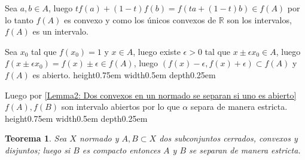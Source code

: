 \documentclass[11pt]{article}
\newcommand{\R}{{\mathbb{R}}}
\newtheorem{theorem}{Teorema}
\numberwithin{theorem}{subsection}
\newenvironment{proof}[1][Demostraci\'on]{\begin{trivlist}
		\item[\hskip \labelsep {\bfseries #1}]}{\end{trivlist}}
\newcommand{\qed}{\nobreak \ifvmode \relax \else
	\ifdim\lastskip<1.5em \hskip-\lastskip
	\hskip1.5em plus0em minus0.5em \fi \nobreak
	\vrule height0.75em width0.5em depth0.25em\fi}
\begin{document}
\begin{proof}
	\begin{proof}[Demostraci\'on del lema]
		Sea $a,b \in A$, luego $tf(a) + (1-t)f(b)= f(ta + (1-t)b) \in f(A)$ por lo tanto $f(A)$ es convexo y como los \'unicos convexos de $\R$ son los intervalos, $f(A)$ es un intervalo.
		
		Sea $x_0$ tal que $f(x_0) = 1$ y $x \in A$, luego existe $\epsilon > 0$ tal que $x \pm \epsilon x_0 \in A$, luego $f(x \pm \epsilon x_0) = f(x) \pm \epsilon \in f(A)$, luego $\left(f(x) - \epsilon, f(x) + \epsilon\right) \subset f(A)$ y $f(A)$ es abierto. \qed
	\end{proof}
	
	Luego por \ref{Lemma2: Dos convexos en un normado se separan si uno es abierto} $f(A),f(B)$ son intervalo abiertos por lo que $\alpha$ separa de manera estricta. \qed
	
\end{proof}

\begin{theorem}
	\label{Un cerrado se separa de un compacto}
	Sea $X$ normado y $A,B \subset X$ dos subconjuntos cerrados, convexos y disjuntos; luego si $B$ es compacto entonces $A$ y $B$ se separan de manera estricta.
\end{theorem}
\end{document}
